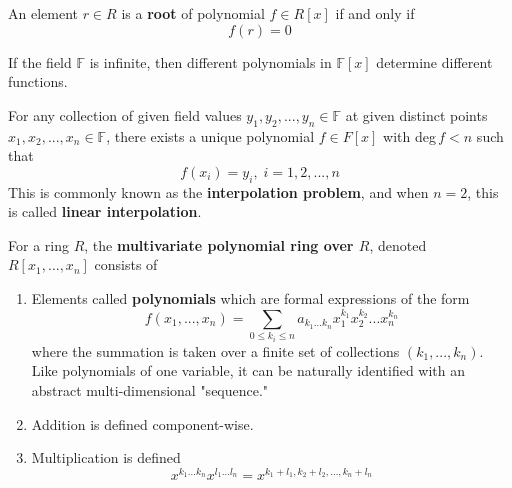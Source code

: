   \begin{definition}
    An element $r \in R$ is a \textbf{root} of polynomial $f \in R[x]$ if and only if 
    \begin{equation}
      f(r) = 0
    \end{equation}
  \end{definition}

  \begin{theorem}
    If the field $\mathbb{F}$ is infinite, then different polynomials in $\mathbb{F}[x]$ determine different functions. 
  \end{theorem}

  \begin{theorem}[Interpolation]
    For any collection of given field values $y_1, y_2, ..., y_n \in \mathbb{F}$ at given distinct points $x_1, x_2, ..., x_n \in \mathbb{F}$, there exists a unique polynomial $f \in F[x]$ with deg$\, f < n$ such that
    \begin{equation}
      f(x_i) = y_i, \; i = 1, 2, ..., n
    \end{equation}
    This is commonly known as the \textbf{interpolation problem}, and when $n = 2$, this is called \textbf{linear interpolation}. 
  \end{theorem}

  \begin{definition} 
    For a ring $R$, the \textbf{multivariate polynomial ring over $R$}, denoted $R[x_1, \ldots, x_n]$ consists of 
    \begin{enumerate}
      \item Elements called \textbf{polynomials} which are formal expressions of the form 
      \begin{equation}
        f(x_1, ..., x_n) =  \sum_{0 \leq k_i \leq n} a_{k_1 ... k_n} x_1^{k_1} x_2^{k_2} ... x_n^{k_n}
      \end{equation}
      where the summation is taken over a finite set of collections $(k_1, ..., k_n)$. Like polynomials of one variable, it can be naturally identified with an abstract multi-dimensional "sequence." 

      \item Addition is defined component-wise. 

      \item Multiplication is defined 
      \begin{equation}
        x^{k_1 \ldots k_n} x^{l_1 \ldots l_n} = x^{k_1 + l_1, k_2 + l_2, \ldots, k_n + l_n}
      \end{equation}
    \end{enumerate}
  \end{definition}

